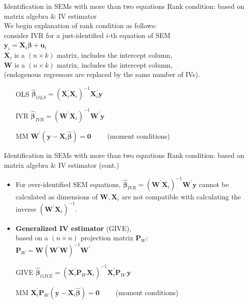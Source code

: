 \documentclass[usenames,dvipsnames]{beamer}
\begin{document}
\begin{frame}{Identification in SEMs with more than two equations}
Rank condition: based on matrix algebra \& IV estimator\\
\medskip
We begin explanation of rank condition as follows:\\
\smallskip
consider IVR for a just-identified $i$-th equation of SEM\\
\medskip
$\bm{y}_i = \bm{X}_i \bm{\beta} + \bm{u}_i$\\
\medskip
$\bm{X}_i$ is a $(n\! \times \! k)$ matrix, includes the intercept column,\\
\medskip
$\bm{W}$ is a $(n\! \times \! k)$ matrix, includes the intercept column,\\
(endogenous regressors are replaced by the same number of IVs).\\
\bigskip
\begin{itemize}
\item[OLS] $\hat{\bm\beta}_{\textit{OLS}}=
\left(\bm{X}^{\prime}_i \bm{X}_i \right)^{-1}\! \bm{X}^{\prime}_i \bm{y}$\\
\medskip
\item[IVR] $\hat{\bm\beta}_{\textit{IVR}}=
\left(\bm{W}^{\prime}\bm{X}_i \right)^{-1}\! \bm{W}^{\prime} \bm{y}$\\
\medskip
\item[MM] $\bm{W}^{\prime} \! \left( \bm{y} - \bm{X}_i \hat{\bm{\beta}} \right) = \bm{0} \qquad$ (moment conditions)
\end{itemize}
\end{frame}
\begin{frame}{Identification in SEMs with more than two equations}
Rank condition: based on matrix algebra \& IV estimator (cont.)\\
\medskip
\begin{itemize}
\item For over-identified SEM equations, $\hat{\bm\beta}_{\textit{IVR}}=
\left(\bm{W}^{\prime}\bm{X}_i \right)^{-1}\! \bm{W}^{\prime} \bm{y}$ cannot be calculated as dimensions of $\bm{W} \! , \bm{X}_i$ are not compatible with calculating the inverse $\left(\bm{W}^{\prime}\bm{X}_i \right)^{-1}$.\\
\medskip
\item \textbf{Generalized IV estimator} (GIVE), 
\\based on a $(n\! \times \! n) $ projection matrix $\bm{P}_W$:\\
\medskip
$\bm{P}_W= \bm{W} \left(\bm{W}^{\prime}\bm{W}\right)^{-1}\! \bm{W}^{\prime}$\\
\bigskip
\item[GIVE] $\hat{\bm\beta}_{\textit{GIVE}}=
\left(\bm{X}^{\prime}_i \bm{P}_W \bm{X}_i\right)^{-1}\! \bm{X}^{\prime}_i \bm{P}_W \, \bm{y}$\\
\medskip
\item[MM] $\bm{X}^{\prime}_i \bm{P}_W \! \left( \bm{y} - \bm{X}_i \hat{\bm{\beta}} \right) = \bm{0} \qquad$ (moment conditions)
\end{itemize}
\end{frame}
\end{document}
